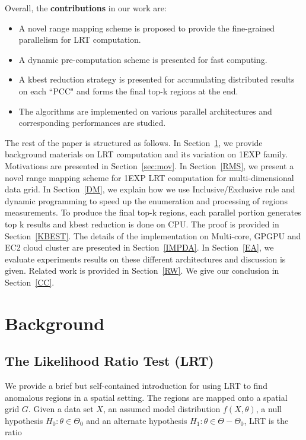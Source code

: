 \documentclass[10pt,journal,cspaper,compsoc]{IEEEtran}
\begin{document}
Overall, the {\bf contributions} in our work are:
\begin{itemize}
\renewcommand{\labelitemi}{$\bullet$}
\item A novel range mapping scheme is proposed to provide the fine-grained parallelism for LRT computation.
\item A dynamic pre-computation scheme is presented for fast computing.
\item A kbest reduction strategy is presented for accumulating distributed results on each ``PCC" and forms the final top-k regions at the end.
\item The algorithms are implemented on various parallel architectures and corresponding performances are studied.
\end{itemize}

The rest of the paper is structured as follows. In Section~\ref{BG}, we provide
background materials on LRT computation and its variation on 1EXP family. Motivations are presented in Section~\ref{sec:mov}.  In Section~\ref{RMS}, we present a novel range mapping scheme for 1EXP LRT computation for multi-dimensional data grid. In Section~\ref{DM}, we explain how we use
Inclusive/Exclusive rule and dynamic programming to speed up the enumeration and
processing of regions measurements. To produce the final top-k regions, each parallel portion generates top k results and kbest reduction is done on CPU. The proof is provided in Section~\ref{KBEST}. The details of the implementation on Multi-core, GPGPU and EC2 cloud cluster are presented in
Section~\ref{IMPDA}. In Section~\ref{EA}, we evaluate experiments results on these different architectures and discussion is given. Related
work is provided in Section~\ref{RW}. We give our conclusion in
Section~\ref{CC}.

\section {Background} \label{BG}

\subsection{The Likelihood Ratio Test (LRT)}
We provide a brief but self-contained introduction for using LRT
to find anomalous regions in a spatial setting. The regions are mapped onto a spatial grid $G$. Given a data set $X$, an assumed model distribution $f(X,\theta)$, a null hypothesis $H_{0}: \theta \in \Theta_0 $ and an alternate hypothesis $H_{1}: \theta \in {\Theta-\Theta_0}$, LRT is the ratio
\end{document}
